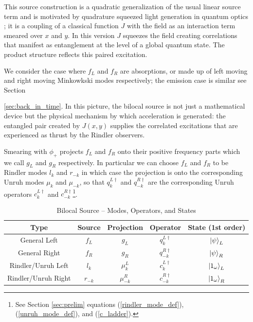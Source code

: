 \documentclass[12pt,a4paper]{article}
\begin{document}
This source construction is a quadratic generalization of the usual linear source term \cite{Schwinger_1966} \cite{ryder1996quantum} and is motivated by quadrature squeezed light generation in quantum optics \cite{gerry2023introductory}; it is a coupling of a classical function $J$ with the field as an interaction term smeared over $x$ and $y$. In this version $J$ squeezes the field creating correlations that manifest as entanglement at the level of a global quantum state. The product structure reflects this paired excitation.

We consider the case where $f_L$ and $f_R$ are absorptions, or made up of left moving and right moving Minkowkski modes respectively; the emission case is similar see Section {\ref{sec:back_in_time}. In this picture, the bilocal source is not just a mathematical device but the physical mechanism by which acceleration is generated: the entangled pair created by $J(x,y)$ supplies the correlated excitations that are experienced as thrust by the Rindler observers.


Smearing with $\phi_+$ projects $f_L$ and $f_R$ onto their positive frequency parts which we call $g_L$ and $g_R$ respectively. In particular we can choose $f_L$ and $f_R$ to be Rindler modes $l_k$ and $r_{-k}$ in which case the projection is onto the corresponding Unruh modes $\mu_k$ and $\mu_{-k}$, so that $q_{k}^{L\dagger}$ and $q_{-k}^{R\dagger}$ are the corresponding Unruh operators $c_{k}^{L\dagger}$ and $c_{-k}^{R\dagger}$\footnote{See Section \ref{sec:prelim} equations (\ref{rindler_mode_def}), (\ref{unruh_mode_def}), and (\ref{c_ladder}).}.  

\begin{table}[ht]
\caption{Bilocal Source -- Modes, Operators, and States}
\centering
\begin{tabular}{c c c c c} %
\hline\hline
Type & Source & Projection & Operator & State (1st order)\\ [0.5ex] %
\hline %
General Left & $f_L$ & $g_L$ & $q_{k}^{L\dagger}$ & $\ket{\psi}_{L}$\\
General Right & $f_R$ & $g_R$ & $q_{-k}^{R\dagger}$  & $\ket{\psi}_{R}$\\
Rindler/Unruh Left & $l_{k}$ & $\mu_{k}^L$ & $c_{k}^{L\dagger}$ & $\ket{1_\omega}_{L}$\\
Rindler/Unruh Right & $r_{-k}$ & $\mu_{-k}^R$ & $c_{-k}^{R\dagger}$ & $\ket{1_\omega}_{R}$\\
\hline %
\end{tabular}
\label{table:modes}
\end{table}

}
\end{document}
